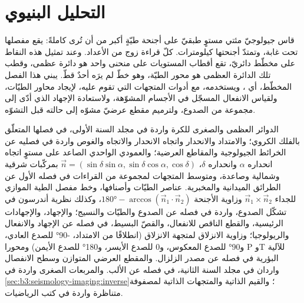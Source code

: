 \chapter{التحليل البنيوي}\label{ch:b3:structural-analysis}

قاس جيولوجيّ مئتي مستوٍ طبقيّ على أجنحة طيّةٍ
أكبر من أن تُرى كاملةً: يقع مفصلها تحت غابة، وتمتدّ أجنحتها كيلومترات.
كلّ قراءة زوج من الأعداد. وعند تمثيل هذه النقاط على مخطّط دائريّ،
تقع أقطاب المستويات على منحنى واحد هو دائرة عظمى، وقطب تلك الدائرة العظمى هو
محور الطيّة، وهو خطّ لم يرَه أحدٌ قطّ.
يبني هذا الفصل المخطّط، أي ،
ويستخدمه، مع أدوات المتجهات التي تقوم عليه، لإيجاد محاور الطيّات، ولقياس الانفعال المسجّل في
الأجسام المشوّهة، ولاستعادة الإجهاد الذي أدّى إلى مجموعة من الصدوع، ولترميم مقطع عرضيّ مشوّه
إلى حالته قبل
التشوّه.

\begin{recall}
الدوائر العظمى والصغرى للكرة واردة في مجلد السنة الأولى، في فصلها
المتعلّق بالفلك الكروي؛ والامتداد والانحدار واتجاه الانحدار والاتجاه والغوص واردة في فصليه
عن الخرائط الجيولوجية والمقاطع العرضية؛ والعمودي الواحدي الصاعد على مستوٍ
اتجاه انحداره $\alpha$ وانحداره $\delta$، $\vec n = (\sin\delta
\sin\alpha, \sin\delta\cos\alpha, \cos\delta)$ بمركّبات شرقية وشمالية وصاعدة،
ومتوسط المتجهات لمجموعة من القراءات في فصله الأول عن الطرائق الميدانية والمخبرية.
عناصر الطيّات وأصنافها، وخط مفصل الطية الموازي
للجداء $\vec n_1\times\vec n_2$ وزاوية الأجنحة
$\ang{180} - \arccos(\vec n_1\cdot\vec n_2)$، وكذلك نظرية أندرسون في تشكّل الصدوع،
واردة في فصله عن الصدوع والطيّات والنسيج؛ والإجهاد،
والإجهادات الرئيسية، والقطع الناقص للانفعال، والقصّ البسيط، في فصله عن
الإجهاد والانفعال والريولوجيا؛ وزاوية الانزلاق لمتجهة الانزلاق (انطلاقًا من الامتداد،
\ang{-90} للصدع العادي، و\ang{90} للصدع المعكوس، و0 للصدع الأيسر،
و\ang{180} للصدع الأيمن) ومحورا P وT للآلية البؤرية في فصله عن مصدر الزلزال.
والمقطع العرضي المتوازن وسطح الانفصال واردان في مجلد السنة الثانية،
في فصله عن الألب. والمربعات الصغرى واردة
في \cref{sec:b3:seismology-imaging:inverse}؛ والقيم الذاتية والمتجهات الذاتية لمصفوفة متناظرة واردة في
كتب الرياضيات.
\end{recall}


